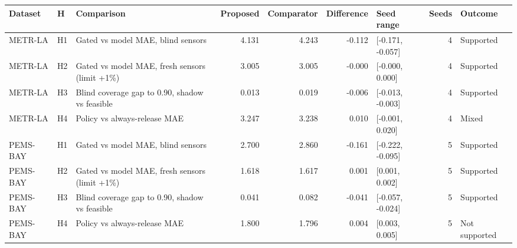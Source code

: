 \begin{tabular}{lllrrrlrl}
\toprule
Dataset & H & Comparison & Proposed & Comparator & Difference & Seed range & Seeds & Outcome \\
\midrule
METR-LA & H1 & Gated vs model MAE, blind sensors & 4.131 & 4.243 & -0.112 & [-0.171, -0.057] & 4 & Supported \\
METR-LA & H2 & Gated vs model MAE, fresh sensors (limit +1\%) & 3.005 & 3.005 & -0.000 & [-0.000, 0.000] & 4 & Supported \\
METR-LA & H3 & Blind coverage gap to 0.90, shadow vs feasible & 0.013 & 0.019 & -0.006 & [-0.013, -0.003] & 4 & Supported \\
METR-LA & H4 & Policy vs always-release MAE & 3.247 & 3.238 & 0.010 & [-0.001, 0.020] & 4 & Mixed \\
PEMS-BAY & H1 & Gated vs model MAE, blind sensors & 2.700 & 2.860 & -0.161 & [-0.222, -0.095] & 5 & Supported \\
PEMS-BAY & H2 & Gated vs model MAE, fresh sensors (limit +1\%) & 1.618 & 1.617 & 0.001 & [0.001, 0.002] & 5 & Supported \\
PEMS-BAY & H3 & Blind coverage gap to 0.90, shadow vs feasible & 0.041 & 0.082 & -0.041 & [-0.057, -0.024] & 5 & Supported \\
PEMS-BAY & H4 & Policy vs always-release MAE & 1.800 & 1.796 & 0.004 & [0.003, 0.005] & 5 & Not supported \\
\bottomrule
\end{tabular}
